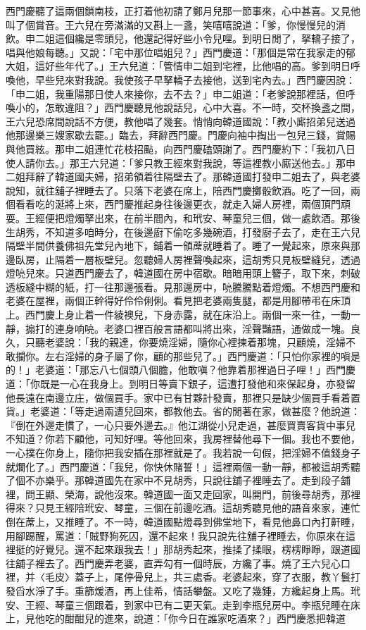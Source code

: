 \begin{showcontents}{}
西門慶聽了這兩個鎖南枝，正打着他初請了鄭月兒那一節事來，心中甚喜。又見他叫了個賞音。王六兒在旁滿滿的又斟上一盞，笑嘻嘻說道：「爹，你慢慢兒的消飲。申二姐這個纔是零頭兒，他還記得好些小令兒哩。到明日閒了，拏轎子接了，唱與他娘每聽。」又說：「宅中那位唱姐兒？」西門慶道：「那個是常在我家走的郁大姐，這好些年代了。」王六兒道：「管情申二姐到宅裡，比他唱的高。爹到明日呼喚他，早些兒來對我說。我使孩子早拏轎子去接他，送到宅內去。」西門慶因說：「申二姐，我重陽那日使人來接你，去不去？」申二姐道：「老爹說那裡話，但呼喚小的，怎敢違阻？」西門慶聽見他說話兒，心中大喜。不一時，交杯換盞之間，王六兒恐席間說話不方便，教他唱了幾套。悄悄向韓道國說：「教小廝招弟兒送過他那邊樂三嫂家歇去罷。」臨去，拜辭西門慶。門慶向袖中掏出一包兒三錢，賞賜與他買絃。那申二姐連忙花枝招颭，向西門慶磕頭謝了。西門慶約下：「我初八日使人請你去。」那王六兒道：「爹只教王經來對我說，等這裡教小廝送他去。」那申二姐拜辭了韓道國夫婦，招弟領着往隔壁去了。那韓道國打發申二姐去了，與老婆說知，就往舖子裡睡去了。只落下老婆在席上，陪西門慶擲骰飲酒。吃了一回，兩個看看吃的涎將上來，西門慶推起身往後邊更衣，就走入婦人房裡，兩個頂門頑耍。王經便把燈燭拏出來，在前半間內，和玳安、琴童兒三個，做一處飲酒。那後生胡秀，不知道多咱時分，在後邊廚下偷吃多幾碗酒，打發廚子去了，走在王六兒隔壁半間供養佛祖先堂兒內地下，鋪着一領蓆就睡着了。睡了一覺起來，原來與那邊臥房，止隔着一層板壁兒。忽聽婦人房裡聲喚起來，這胡秀只見板壁縫兒，透過燈喨兒來。只道西門慶去了，韓道國在房中宿歇。暗暗用頭上簪子，取下來，刺破透板縫中糊的紙，打一往那邊張看。見那邊房中，喨騰騰點着燈燭。不想西門慶和老婆在屋裡，兩個正幹得好伶伶俐俐。看見把老婆兩隻腿，都是用腳帶弔在床頂上。西門慶上身止着一件綾襖兒，下身赤露，就在床沿上。兩個一來一往，一動一靜，搧打的連身响喨。老婆口裡百般言語都叫將出來，淫聲豔語，通做成一塊。良久，只聽老婆說：「我的親達，你要燒淫婦，隨你心裡揀着那塊，只顧燒，淫婦不敢攔你。左右淫婦的身子屬了你，顧的那些兒了。」西門慶道：「只怕你家裡的嗔是的！」老婆道：「那忘八七個頭八個膽，他敢嗔？他靠着那裡過日子哩！」西門慶道：「你既是一心在我身上。到明日等賣下銀子，這遭打發他和來保起身，亦發留他長遠在南邊立庄，做個買手。家中已有甘夥計發賣，那裡只是缺少個買手看着置貨。」老婆道：「等走過兩遭兒回來，都教他去。省的閒著在家，做甚麼？他說道：『倒在外邊走慣了，一心只要外邊去。』他江湖從小兒走過，甚麼買賣客貨中事兒不知道？你若下顧他，可知好哩。等他回來，我房裡替他尋下一個。我也不要他，一心撲在你身上，隨你把我安插在那裡就是了。我若說一句假，把淫婦不值錢身子就爛化了。」西門慶道：「我兒，你快休賭誓！」這裡兩個一動一靜，都被這胡秀聽了個不亦樂乎。那韓道國先在家中不見胡秀，只說往舖子裡睡去了。走到段子舖裡，問王顯、榮海，說他沒來。韓道國一面又走回家，叫開門，前後尋胡秀，那裡得來？只見王經陪玳安、琴童，三個在前邊吃酒。這胡秀聽見他的語音來家，連忙倒在蓆上，又推睡了。不一時，韓道國點燈尋到佛堂地下，看見他鼻口內打鼾睡，用腳踢醒，罵道：「賊野狗死囚，還不起來！我只說先往舖子裡睡去，你原來在這裡挺的好覺兒。還不起來跟我去！」那胡秀起來，推揉了揉眼，楞楞睜睜，跟道國往舖子裡去了。西門慶弄老婆，直弄勾有一個時辰，方纔了事。燒了王六兒心口裡，并〈毛皮〉蓋子上，尾停骨兒上，共三處香。老婆起來，穿了衣服，教丫鬟打發舀水淨了手。重篩煖酒，再上佳希，情話攀盤。又吃了幾鍾，方纔起身上馬。玳安、王經、琴童三個跟着，到家中已有二更天氣。走到李瓶兒房中。李瓶兒睡在床上，見他吃的酣酣兒的進來，說道：「你今日在誰家吃酒來？」西門慶悉把韓道
\end{showcontents}

